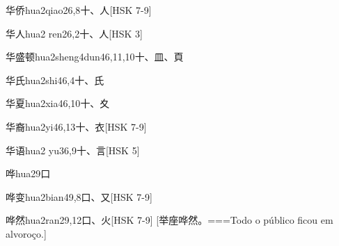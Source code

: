 \begin{EntryWithPhonetic}{华侨}{hua2qiao2}{6,8}{⼗、⼈}[HSK 7-9]
\end{EntryWithPhonetic}

\begin{EntryWithPhonetic}{华人}{hua2 ren2}{6,2}{⼗、⼈}[HSK 3]
\end{EntryWithPhonetic}

\begin{EntryWithPhonetic}{华盛顿}{hua2sheng4dun4}{6,11,10}{⼗、⽫、⾴}
\end{EntryWithPhonetic}

\begin{EntryWithPhonetic}{华氏}{hua2shi4}{6,4}{⼗、⽒}
\end{EntryWithPhonetic}

\begin{EntryWithPhonetic}{华夏}{hua2xia4}{6,10}{⼗、⼢}
\end{EntryWithPhonetic}

\begin{EntryWithPhonetic}{华裔}{hua2yi4}{6,13}{⼗、⾐}[HSK 7-9]
\end{EntryWithPhonetic}

\begin{EntryWithPhonetic}{华语}{hua2 yu3}{6,9}{⼗、⾔}[HSK 5]
\end{EntryWithPhonetic}

\begin{EntryWithPhonetic}{哗}{hua2}{9}{⼝}
\end{EntryWithPhonetic}

\begin{EntryWithPhonetic}{哗变}{hua2bian4}{9,8}{⼝、⼜}[HSK 7-9]
\end{EntryWithPhonetic}

\begin{EntryWithPhonetic}{哗然}{hua2ran2}{9,12}{⼝、⽕}[HSK 7-9]
  [举座哗然。===Todo o público ficou em alvoroço.]
\end{EntryWithPhonetic}

